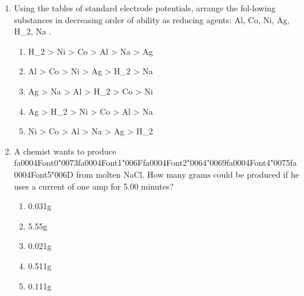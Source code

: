 \documentclass[12pt]{article}
\begin{document}
\begin{enumerate}[label=\arabic*.]
\begin{enumerate}[label=(\alph*)]
    \item 450 liters
    \item 100 liters
    \item 350 liters
    \item 150 liters
\end{enumerate}
\item Using the tables of standard electrode potentials, arrange the fol-lowing substances in
decreasing order of ability as reducing agents: Al, Co, Ni, Ag, H\_2, Na .
\begin{enumerate}[label=(\alph*)]
    \item H\_2 \textgreater{} Ni \textgreater{} Co \textgreater{} Al \textgreater{} Na \textgreater{} Ag
    \item Al \textgreater{} Co \textgreater{} Ni \textgreater{} Ag \textgreater{} H\_2 \textgreater{} Na
    \item Ag \textgreater{} Na \textgreater{} Al \textgreater{} H\_2 \textgreater{} Co \textgreater{} Ni
    \item Ag \textgreater{} H\_2 \textgreater{} Ni \textgreater{} Co \textgreater{} Al \textgreater{} Na
    \item Ni \textgreater{} Co \textgreater{} Al \textgreater{} Na \textgreater{} Ag \textgreater{} H\_2
\end{enumerate}
\item A chemist wants to produce {\csname fa0004Font0\endcsname\char"0073}{\csname fa0004Font1\endcsname\char"006F}{\csname fa0004Font2\endcsname\char"0064}{\char"0069}{\csname fa0004Font4\endcsname\char"0075}{\csname fa0004Font5\endcsname\char"006D} from molten NaCl. How many grams could be produced if
he uses a current of one amp for 5.00 minutes?
\begin{enumerate}[label=(\alph*)]
    \item 0.031g
    \item 5.55g
    \item 0.021g
    \item 0.511g
    \item 0.111g
\end{enumerate}
\end{enumerate}
\end{document}
